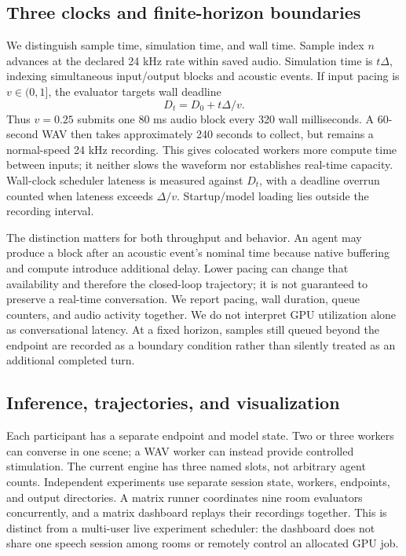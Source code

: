 \documentclass{article}
\begin{document}
\subsection{Three clocks and finite-horizon boundaries}
We distinguish sample time, simulation time, and wall time. Sample index $n$ advances at the declared 24 kHz rate within saved audio. Simulation time is $t\Delta$, indexing simultaneous input/output blocks and acoustic events. If input pacing is $v\in(0,1]$, the evaluator targets wall deadline
\begin{equation}
 D_t=D_0+t\Delta/v.
\end{equation}
Thus $v=0.25$ submits one 80 ms audio block every 320 wall milliseconds. A 60-second WAV then takes approximately 240 seconds to collect, but remains a normal-speed 24 kHz recording. This gives colocated workers more compute time between inputs; it neither slows the waveform nor establishes real-time capacity. Wall-clock scheduler lateness is measured against $D_t$, with a deadline overrun counted when lateness exceeds $\Delta/v$. Startup/model loading lies outside the recording interval.

The distinction matters for both throughput and behavior. An agent may produce a block after an acoustic event's nominal time because native buffering and compute introduce additional delay. Lower pacing can change that availability and therefore the closed-loop trajectory; it is not guaranteed to preserve a real-time conversation. We report pacing, wall duration, queue counters, and audio activity together. We do not interpret GPU utilization alone as conversational latency. At a fixed horizon, samples still queued beyond the endpoint are recorded as a boundary condition rather than silently treated as an additional completed turn.

\subsection{Inference, trajectories, and visualization}
Each participant has a separate endpoint and model state. Two or three workers can converse in one scene; a WAV worker can instead provide controlled stimulation. The current engine has three named slots, not arbitrary agent counts. Independent experiments use separate session state, workers, endpoints, and output directories. A matrix runner coordinates nine room evaluators concurrently, and a matrix dashboard replays their recordings together. This is distinct from a multi-user live experiment scheduler: the dashboard does not share one speech session among rooms or remotely control an allocated GPU job.
\end{document}
